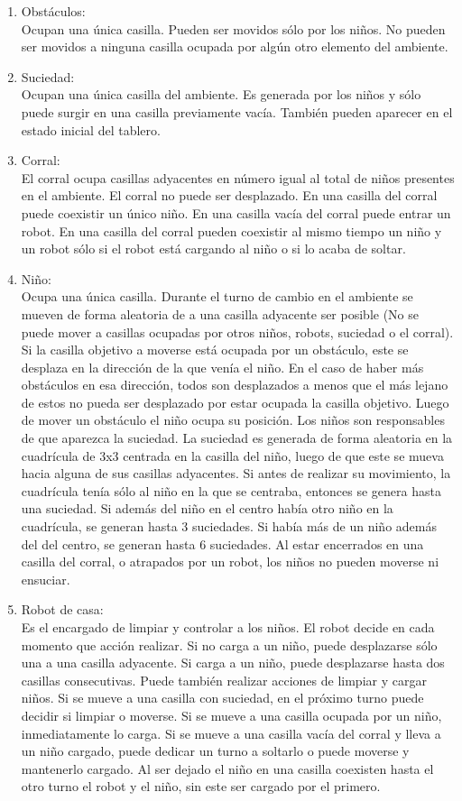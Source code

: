 \documentclass[a4paper,12pt]{article}
\begin{document}
\begin{enumerate}
\item {Obstáculos:}\\
Ocupan una única casilla. Pueden ser movidos sólo por los niños. No pueden ser movidos a ninguna casilla ocupada por algún otro elemento del ambiente.
\item {Suciedad:}\\
Ocupan una única casilla del ambiente. Es generada por los niños y sólo puede surgir en una casilla previamente vacía. También pueden aparecer en el estado inicial del tablero.
\item {Corral:}\\
El corral ocupa casillas adyacentes en número igual al total de niños presentes en el ambiente. El corral no puede ser desplazado. En una casilla del corral puede coexistir un único niño. En una casilla vacía del corral puede entrar un robot. En una casilla del corral pueden coexistir al mismo tiempo un niño y un robot sólo si el robot está cargando al niño o si lo acaba de soltar.
\item {Niño:}\\
Ocupa una única casilla. Durante el turno de cambio en el ambiente se mueven de forma aleatoria de a una casilla adyacente ser posible (No se puede mover a casillas ocupadas por otros niños, robots, suciedad o el corral). Si la casilla objetivo a moverse está ocupada por un obstáculo, este se desplaza en la dirección de la que venía el niño. En el caso de haber más obstáculos en esa dirección, todos son desplazados a menos que el más lejano de estos no pueda ser desplazado por estar ocupada la casilla objetivo. Luego de mover un obstáculo el niño ocupa su posición. Los niños son responsables de que aparezca la suciedad. La suciedad es generada de forma aleatoria en la cuadrícula de 3x3 centrada en la casilla del niño, luego de que este se mueva hacia alguna de sus casillas adyacentes. Si antes de realizar su movimiento, la cuadrícula tenía sólo al niño en la que se centraba, entonces se genera hasta una suciedad. Si además del niño en el centro había otro niño en la cuadrícula, se generan hasta 3 suciedades. Si había más de un niño además del del centro, se generan hasta 6 suciedades. Al estar encerrados en una casilla del corral, o atrapados por un robot, los niños no pueden moverse ni ensuciar.

\item {Robot de casa:}\\
Es el encargado de limpiar y controlar a los niños. El robot decide en cada momento que acción realizar. Si no carga a un niño, puede desplazarse sólo una a una casilla adyacente. Si carga a un niño, puede desplazarse hasta dos casillas consecutivas. Puede también realizar acciones de limpiar y cargar niños. Si se mueve a una casilla con suciedad, en el próximo turno puede decidir si limpiar o moverse. Si se mueve a una casilla ocupada por un niño, inmediatamente lo carga. Si se mueve a una casilla vacía del corral y lleva a un niño cargado, puede dedicar un turno a soltarlo o puede moverse y mantenerlo cargado. Al ser dejado el niño en una casilla coexisten hasta el otro turno el robot y el niño, sin este ser cargado por el primero.
\end{enumerate}
\end{document}
